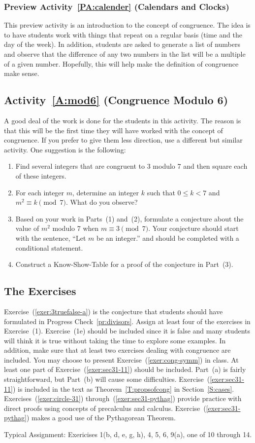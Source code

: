  

\subsubsection*{Preview Activity~\ref{PA:calender} (Calendars and Clocks)}
This preview activity is an introduction to the concept of congruence.  The idea is to have students work with things that repeat on a regular basis (time and the day of the week).  In addition, students are asked to generate a list of numbers and observe that the difference of any two numbers in the list will be a multiple of a given number.  Hopefully, this will help make the definition of congruence make sense.
\hbreak


\subsection*{Activity~\ref{A:mod6} (Congruence Modulo 6)}
A good deal of the work is done for the students in this activity.  The reason is that this will be the first time they will have worked with the concept of congruence.  If you prefer to give them less direction, use a different but similar activity.  One suggestion is the following:
\begin{enumerate}
\item Find several integers that are congruent to 3 modulo 7 and then square each of these integers.
\item For each integer $m$, determine an integer $k$ such that $0 \leq k < 7$ and 
$m^2 \equiv k \pmod 7$.  What do you observe?
\item Based on your work in Parts~(1) and~(2), formulate a conjecture about the value of $m^2$ modulo 7 when $m \equiv 3 \pmod 7$.  Your conjecture should start with the sentence, ``Let $m$ be an integer.'' and should be completed with a conditional statement.
\item Construct a Know-Show-Table for a proof of the conjecture in Part~(3).
\end{enumerate}
\hbreak

\subsection*{The Exercises}

Exercise~(\ref{exer:3truefalse-a}) is the conjecture that students should have formulated in Progress Check~\ref{pr:divisors}.  Assign at least four of the exercises in Exercise~(1).    Exercise~(1e) should be included since it is false and many students will think it is true without taking the time to explore some examples.  In addition, make sure that at least two exercises dealing with congruence are included.  You may choose to present Exercise~(\ref{exer:cong-symm}) in class.  At least one part of Exercise~(\ref{exer:sec31-11}) should be included.  Part~(a) is fairly straightforward, but Part~(b) will cause some difficulties.  Exercise~(\ref{exer:sec31-11}) is included in the text as Theorem~\ref{T:propsofcong} in Section~\ref{S:cases}.  Exercises~(\ref{exer:circle-31}) through~(\ref{exer:sec31-pythag}) provide practice with direct proofs using concepts of precalculus and calculus.  Exercise~(\ref{exer:sec31-pythag}) makes a good use of the Pythagorean Theorem.

\vskip6pt
\noindent
Typical Assignment:  Exericises 1(b, d, e, g, h), 4, 5, 6, 9(a), one of 10 through 14.
\hbreak
\endinput
